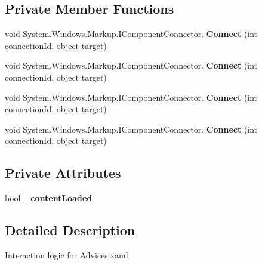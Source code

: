 \subsection*{Private Member Functions}
\begin{DoxyCompactItemize}
\item 
\mbox{\label{class_t_h_b___plugin___social_1_1_advices_1_1_advices_a13d20d8ac01863194fee5df3ef954add}} 
void System.\+Windows.\+Markup.\+I\+Component\+Connector. {\bfseries Connect} (int connection\+Id, object target)
\item 
\mbox{\label{class_t_h_b___plugin___social_1_1_advices_1_1_advices_a13d20d8ac01863194fee5df3ef954add}} 
void System.\+Windows.\+Markup.\+I\+Component\+Connector. {\bfseries Connect} (int connection\+Id, object target)
\item 
\mbox{\label{class_t_h_b___plugin___social_1_1_advices_1_1_advices_a13d20d8ac01863194fee5df3ef954add}} 
void System.\+Windows.\+Markup.\+I\+Component\+Connector. {\bfseries Connect} (int connection\+Id, object target)
\item 
\mbox{\label{class_t_h_b___plugin___social_1_1_advices_1_1_advices_a13d20d8ac01863194fee5df3ef954add}} 
void System.\+Windows.\+Markup.\+I\+Component\+Connector. {\bfseries Connect} (int connection\+Id, object target)
\end{DoxyCompactItemize}
\subsection*{Private Attributes}
\begin{DoxyCompactItemize}
\item 
\mbox{\label{class_t_h_b___plugin___social_1_1_advices_1_1_advices_a46fa630dbede5b98b08a931896020306}} 
bool {\bfseries \+\_\+content\+Loaded}
\end{DoxyCompactItemize}


\subsection{Detailed Description}
Interaction logic for Advices.\+xaml 

